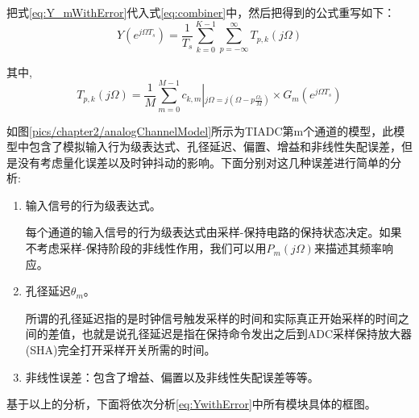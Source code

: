 		把式\ref{eq:Y_mWithError}代入式\ref{eq:combiner}中，然后把得到的公式重写如下：
			 \begin{equation}
				Y\left( {{e^{j\Omega {T_s}}}} \right) = \frac{1}{{{T_s}}}\sum\limits_{k = 0}^{K - 1} {\sum\limits_{p =  - \infty }^\infty  {{T_{p,k}}\left( {j\Omega } \right)} }  \label{eq:YwithError}
			\end{equation}
			
		其中,
			\begin{equation}
				{T_{p,k}}\left( {j\Omega } \right) = \frac{1}{M}\sum\limits_{m = 0}^{M - 1} {{c_{k,m}}} \left| {_{j\Omega  = j\left( {\Omega  - p\frac{{{\Omega _s}}}{M}} \right)}} \right. \times {G_m}\left( {{e^{j\Omega {T_s}}}} \right)\label{eq:TpkFrame}
			\end{equation}
	
	如图\ref{pics/chapter2/analogChannelModel}所示为TIADC第m个通道的模型，此模型中包含了模拟输入行为级表达式、孔径延迟、偏置、增益和非线性失配误差，但是没有考虑量化误差以及时钟抖动的影响。下面分别对这几种误差进行简单的分析:
		\begin{enumerate}
			\item 输入信号的行为级表达式。\par
				每个通道的输入信号的行为级表达式由采样-保持电路的保持状态决定。如果不考虑采样-保持阶段的非线性作用，我们可以用${P_m(j\Omega )}$来描述其频率响应。
			\item 孔径延迟$\theta _m$。\par
				所谓的孔径延迟指的是时钟信号触发采样的时间和实际真正开始采样的时间之间的差值，也就是说孔径延迟是指在保持命令发出之后到ADC采样保持放大器(SHA)完全打开采样开关所需的时间。
			\item 非线性误差：包含了增益、偏置以及非线性失配误差等等。
		\end{enumerate}
	
	基于以上的分析，下面将依次分析\ref{eq:YwithError}中所有模块具体的框图。\par
	
